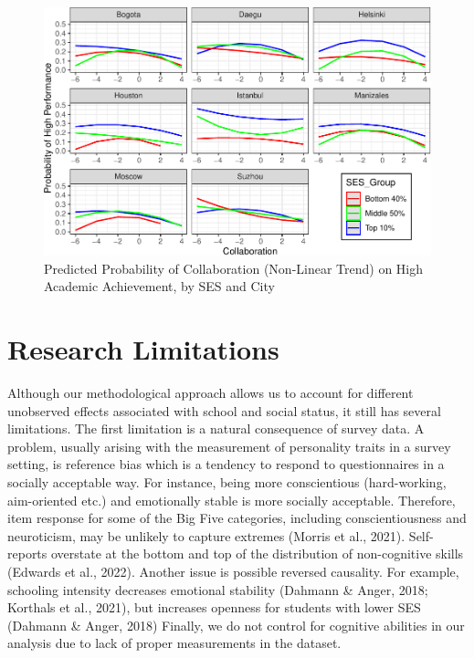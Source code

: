 \documentclass[
  12pt,
  a4paper,
]{article}
\begin{document}
\begin{figure}
\centering
\includegraphics{ncs_and_academic_achievementRmd_files/figure-latex/collaboration-1.pdf}
\caption{Predicted Probability of Collaboration (Non-Linear Trend) on
High Academic Achievement, by SES and City}
\end{figure}

\hypertarget{research-limitations}{%
\section{Research Limitations}\label{research-limitations}}

Although our methodological approach allows us to account for different
unobserved effects associated with school and social status, it still
has several limitations. The first limitation is a natural consequence
of survey data. A problem, usually arising with the measurement of
personality traits in a survey setting, is reference bias which is a
tendency to respond to questionnaires in a socially acceptable way. For
instance, being more conscientious (hard-working, aim-oriented etc.) and
emotionally stable is more socially acceptable. Therefore, item response
for some of the Big Five categories, including conscientiousness and
neuroticism, may be unlikely to capture extremes (Morris et al., 2021).
Self-reports overstate at the bottom and top of the distribution of
non-cognitive skills (Edwards et al., 2022). Another issue is possible
reversed causality. For example, schooling intensity decreases emotional
stability (Dahmann \& Anger, 2018; Korthals et al., 2021), but increases
openness for students with lower SES (Dahmann \& Anger, 2018) Finally,
we do not control for cognitive abilities in our analysis due to lack of
proper measurements in the dataset.
\end{document}
